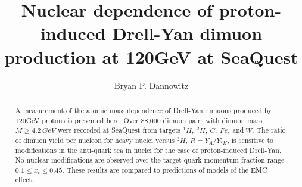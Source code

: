 \documentclass[edeposit,fullpage]{uiucthesis2009}
\begin{document}
\title{Nuclear dependence of proton-induced Drell-Yan dimuon production at 120GeV at SeaQuest}
\author{Bryan P. Dannowitz}
\phdthesis
{}
\maketitle

\frontmatter

\begin{abstract}
A measurement of the atomic mass dependence of Drell-Yan dimuons produced by 120GeV protons
is presented here. Over 88,000 dimuon pairs with dimuon mass $M \geq 4.2\ GeV$ were recorded at 
SeaQuest from targets $^1H,\ ^2H,\ C,\ Fe,\ $and$\ W$. The ratio of dimuon yield per nucleon for 
heavy nuclei versus $^2H$, $R = Y_A / Y_{^2H}$, is sensitive to modifications in the anti-quark
sea in nuclei for the case of proton-induced Drell-Yan. No nuclear modifications are observed
over the target quark momentum fraction range $0.1 \leq x_t \leq 0.45$. These results are
compared to predictions of models of the EMC effect.
\end{abstract}





\end{document}
